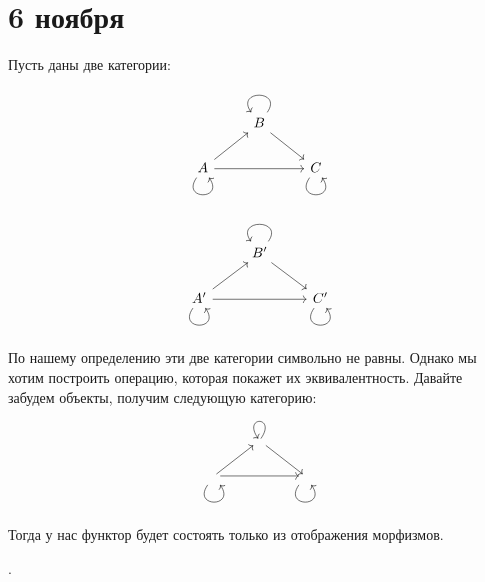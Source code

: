 \chapter{6 ноября}

Пусть даны две категории:
\begin{example}\itemfix
    \begin{figure}[h!]
        \centering
        \begin{minipage}[b]{0.45\textwidth}
            \centering
            \[\begin{tikzcd}
                    & B \arrow[loop, distance=2em, in=125, out=55, swap]{}\arrow{dr} & \\
                    A \arrow[loop, distance=2em, in=305, out=235, swap]{}\arrow{ur}\arrow{rr} & & C\arrow[loop, distance=2em, in=305, out=235, swap]{} \\
                \end{tikzcd}\]
        \end{minipage}
        \begin{minipage}[b]{0.45\textwidth}
            \centering
            \[\begin{tikzcd}
                    & B' \arrow[loop, distance=2em, in=125, out=55, swap]{}\arrow{dr} & \\
                    A' \arrow[loop, distance=2em, in=305, out=235, swap]{}\arrow{ur}\arrow{rr} & & C'\arrow[loop, distance=2em, in=305, out=235, swap]{} \\
                \end{tikzcd}\]
        \end{minipage}
    \end{figure}
\end{example}

По нашему определению эти две категории символьно не равны. Однако мы хотим построить операцию, которая покажет их эквивалентность. Давайте забудем объекты, получим следующую категорию:
\[\begin{tikzcd}
        & {} \arrow[loop, distance=2em, in=125, out=55, swap]{}\arrow{dr} & \\
        {} \arrow[loop, distance=2em, in=305, out=235, swap]{}\arrow{ur}\arrow{rr} & & {}\arrow[loop, distance=2em, in=305, out=235, swap]{} \\
    \end{tikzcd}\]

Тогда у нас функтор будет состоять только из отображения морфизмов.

\unfinished.

